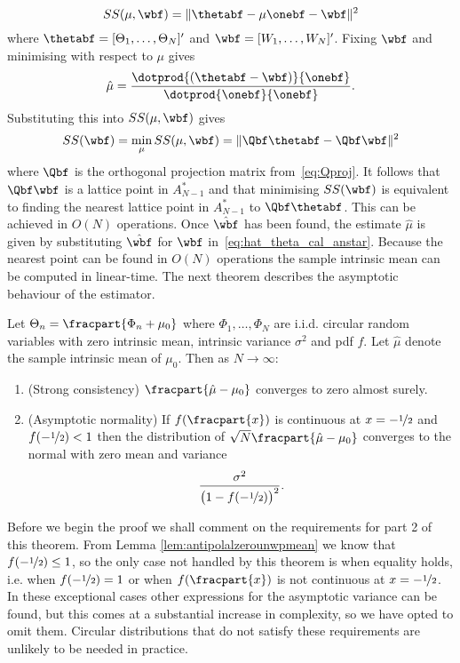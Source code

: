 \documentclass[journal]{IEEEtran}
\begin{document}
\[
SS(\mu, \wbf) = \| \thetabf - \mu\onebf - \wbf \|^2
\]
where $\thetabf = [\Theta_1, \dots, \Theta_N]^\prime$ and $\wbf = [W_1, \dots, W_N]^\prime$.  Fixing $\wbf$ and minimising with respect to $\mu$ gives
\begin{equation} \label{eq:hat_theta_cal_anstar}
\hat{\mu} = \frac{\dotprod{(\thetabf - \wbf)}{\onebf}}{\dotprod{\onebf}{\onebf}}.
\end{equation}
Substituting this into $SS(\mu, \wbf)$ gives
\[
SS(\wbf) = \min_{\mu}SS(\mu, \wbf) = \| \Qbf\thetabf - \Qbf\wbf \|^2
\]
where $\Qbf$ is the orthogonal projection matrix from~\eqref{eq:Qproj}. It follows  that $\Qbf\wbf$ is a lattice point in $A_{N-1}^*$ and that minimising $SS(\wbf)$ is equivalent to finding the nearest lattice point in $A_{N-1}^*$ to $\Qbf\thetabf$.  This can be achieved in $O(N)$ operations. Once $\hat{\wbf}$ has been found, the estimate $\hat{\mu}$ is given by substituting $\hat{\wbf}$ for $\wbf$ in~\eqref{eq:hat_theta_cal_anstar}.  Because the nearest point can be found in $O(N)$ operations the sample intrinsic mean can be computed in linear-time. The next theorem describes the asymptotic behaviour of the estimator.

\begin{theorem}\label{thm:asymp_proof_m=0}
Let $\Theta_n = \fracpart{\Phi_n + \mu_0}$ where $\Phi_1, \dots, \Phi_N$ are i.i.d. circular random variables with zero intrinsic mean, intrinsic variance $\sigma^2$ and pdf $f$. Let $\hat{\mu}$ denote the sample intrinsic mean of $\mu_0$.  Then as $N\rightarrow\infty$:
\begin{enumerate}
\item (Strong consistency) $\fracpart{\hat{\mu} - \mu_0}$ converges to zero almost surely. 
\item (Asymptotic normality) If $f(\fracpart{x})$ is continuous at $x = -\nicefrac{1}{2}$ and $f(-\nicefrac{1}{2}) < 1$ then the distribution of $\sqrt{N}\fracpart{\hat{\mu} - \mu_0}$ converges to the normal with zero mean and variance
\begin{equation}\label{eq:asympvarm=0}
\frac{\sigma^2}{\big(1 - f(-\nicefrac{1}{2}) \big)^2}.
\end{equation}
\end{enumerate}
\end{theorem}
Before we begin the proof we shall comment on the requirements for part 2 of this theorem.  From Lemma \ref{lem:antipolalzerounwpmean} we know that $f(-\nicefrac{1}{2}) \leq 1$, so the only case not handled by this theorem is when equality holds, i.e. when $f(-\nicefrac{1}{2}) = 1$ or when $f(\fracpart{x})$ is not continuous at $x = -\nicefrac{1}{2}$. In these exceptional cases other expressions for the asymptotic variance can be found, but this comes at a substantial increase in complexity, so we have opted to omit them. Circular distributions that do not satisfy these requirements are unlikely to be needed in practice.
\end{document}
